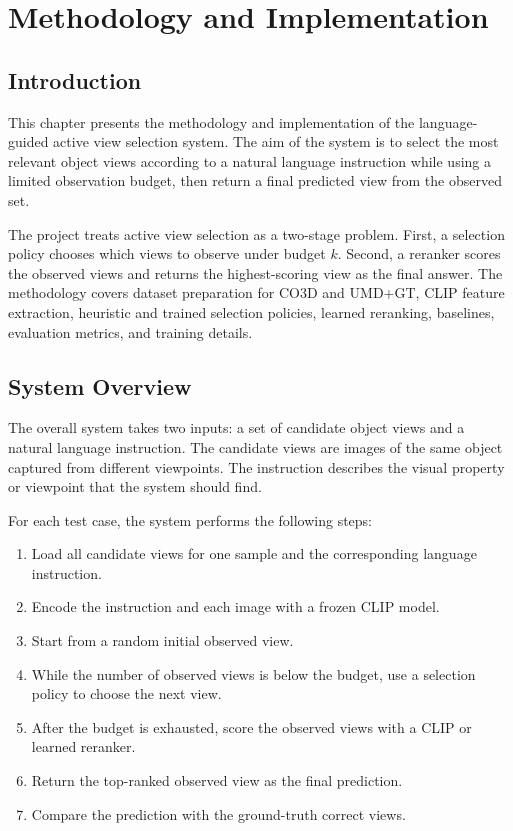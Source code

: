 \chapter{Methodology and Implementation}
\label{chap:methodology}

\section{Introduction}

This chapter presents the methodology and implementation of the language-guided active view selection system. The aim of the system is to select the most relevant object views according to a natural language instruction while using a limited observation budget, then return a final predicted view from the observed set.

The project treats active view selection as a two-stage problem. First, a selection policy chooses which views to observe under budget \(k\). Second, a reranker scores the observed views and returns the highest-scoring view as the final answer. The methodology covers dataset preparation for CO3D and UMD+GT, CLIP feature extraction, heuristic and trained selection policies, learned reranking, baselines, evaluation metrics, and training details.

\section{System Overview}

The overall system takes two inputs: a set of candidate object views and a natural language instruction. The candidate views are images of the same object captured from different viewpoints. The instruction describes the visual property or viewpoint that the system should find.

For each test case, the system performs the following steps:

\begin{enumerate}
    \item Load all candidate views for one sample and the corresponding language instruction.
    \item Encode the instruction and each image with a frozen CLIP model.
    \item Start from a random initial observed view.
    \item While the number of observed views is below the budget, use a selection policy to choose the next view.
    \item After the budget is exhausted, score the observed views with a CLIP or learned reranker.
    \item Return the top-ranked observed view as the final prediction.
    \item Compare the prediction with the ground-truth correct views.
\end{enumerate}

